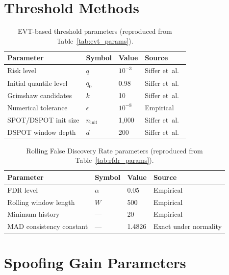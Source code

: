 \documentclass[11pt]{report}
\begin{document}
\section{Threshold Methods}\label{app:hyperparams:thresholds}

\begin{table}[H]
\centering
\caption{EVT-based threshold parameters (reproduced from Table~\ref{tab:evt_params}).}
\label{tab:app_evt}
\begin{tabular}{llll}
\toprule
\textbf{Parameter} & \textbf{Symbol} & \textbf{Value} & \textbf{Source} \\
\midrule
Risk level & $q$ & $10^{-3}$ & Siffer et~al.~\cite{siffer:hal-01640325} \\
Initial quantile level & $q_0$ & 0.98 & Siffer et~al.~\cite{siffer:hal-01640325} \\
Grimshaw candidates & $k$ & 10 & Siffer et~al.~\cite{siffer:hal-01640325} \\
Numerical tolerance & $\epsilon$ & $10^{-8}$ & Empirical \\
SPOT/DSPOT init size & $n_{\text{init}}$ & 1{,}000 & Siffer et~al.~\cite{siffer:hal-01640325} \\
DSPOT window depth & $d$ & 200 & Siffer et~al.~\cite{siffer:hal-01640325} \\
\bottomrule
\end{tabular}
\end{table}

\begin{table}[H]
\centering
\caption{Rolling False Discovery Rate parameters (reproduced from Table~\ref{tab:rfdr_params}).}
\label{tab:app_rfdr}
\begin{tabular}{llll}
\toprule
\textbf{Parameter} & \textbf{Symbol} & \textbf{Value} & \textbf{Source} \\
\midrule
FDR level & $\alpha$ & 0.05 & Empirical \\
Rolling window length & $W$ & 500 & Empirical \\
Minimum history & --- & 20 & Empirical \\
MAD consistency constant & --- & 1.4826 & Exact under normality \\
\bottomrule
\end{tabular}
\end{table}

\section{Spoofing Gain Parameters}\label{app:hyperparams:spoofing}
\end{document}

